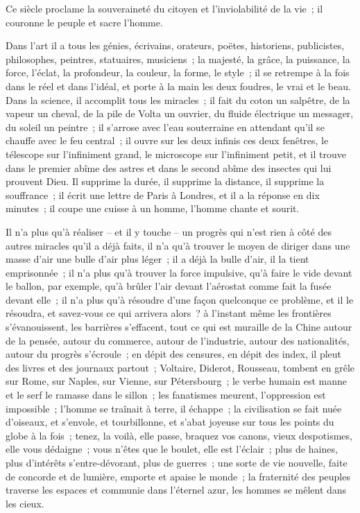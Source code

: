 \documentclass[french,twoside]{book} %
\begin{document}
Ce siècle proclame la souveraineté du citoyen et l’inviolabilité de la vie ; il couronne le peuple et sacre l’homme.\par
Dans l’art il a tous les génies, écrivains, orateurs, poëtes, historiens, publicistes, philosophes, peintres, statuaires, musiciens ; la majesté, la grâce, la puissance, la force, l’éclat, la profondeur, la couleur, la forme, le style ; il se retrempe à la fois dans le réel et dans l’idéal, et porte à la main les deux foudres, le vrai et le beau. Dans la science, il accomplit tous les miracles ; il fait du coton un salpêtre, de la vapeur un cheval, de la pile de Volta un ouvrier, du fluide électrique un messager, du soleil un peintre ; il s’arrose avec l’eau souterraine en attendant qu’il se chauffe avec le feu central ; il ouvre sur les deux infinis ces deux fenêtres, le télescope sur l’infiniment grand, le microscope sur l’infiniment petit, et il trouve dans le premier abîme des astres et dans le second abîme des insectes qui lui prouvent Dieu. Il supprime la durée, il supprime la distance, il supprime la souffrance ; il écrit une lettre de Paris à Londres, et il a la réponse en dix minutes ; il coupe une cuisse à un homme, l’homme chante et sourit.\par
Il n’a plus qu’à réaliser – et il y touche – un progrès qui n’est rien à côté des autres miracles qu’il a déjà faits, il n’a qu’à trouver le moyen de diriger dans une masse d’air une bulle d’air plus léger ; il a déjà la bulle d’air, il la tient emprisonnée ; il n’a plus qu’à trouver la force impulsive, qu’à faire le vide devant le ballon, par exemple, qu’à brûler l’air devant l’aérostat comme fait la fusée devant elle ; il n’a plus qu’à résoudre d’une façon quelconque ce problème, et il le résoudra, et savez-vous ce qui arrivera alors ? à l’instant même les frontières s’évanouissent, les barrières s’effacent, tout ce qui est muraille de la Chine autour de la pensée, autour du commerce, autour de l’industrie, autour des nationalités, autour du progrès s’écroule ; en dépit des censures, en dépit des index, il pleut des livres et des journaux partout ; Voltaire, Diderot, Rousseau, tombent en grêle sur Rome, sur Naples, sur Vienne, sur Pétersbourg ; le verbe humain est manne et le serf le ramasse dans le sillon ; les fanatismes meurent, l’oppression est impossible ; l’homme se traînait à terre, il échappe ; la civilisation se fait nuée d’oiseaux, et s’envole, et tourbillonne, et s’abat joyeuse sur tous les points du globe à la fois ; tenez, la voilà, elle passe, braquez vos canons, vieux despotismes, elle vous dédaigne ; vous n’êtes que le boulet, elle est l’éclair ; plus de haines, plus d’intérêts s’entre-dévorant, plus de guerres ; une sorte de vie nouvelle, faite de concorde et de lumière, emporte et apaise le monde ; la fraternité des peuples traverse les espaces et communie dans l’éternel azur, les hommes se mêlent dans les cieux.\par
\end{document}
